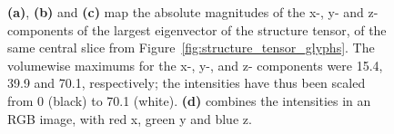     \begin{figure}[htbp]
      \centering
      \caption{\textbf{(a)}, \textbf{(b)} and \textbf{(c)} map the absolute magnitudes of the x-, y- and z- components of the largest eigenvector of the structure tensor, of the same central slice from Figure~\ref{fig:structure_tensor_glyphs}. The volumewise maximums for the x-, y-, and z- components were 15.4, 39.9 and 70.1, respectively; the intensities have thus been scaled from 0 (black) to 70.1 (white). \textbf{(d)} combines the intensities in an RGB image, with red x, green y and blue z.}
      \label{fig:eigencomponents}
    \end{figure}
    
